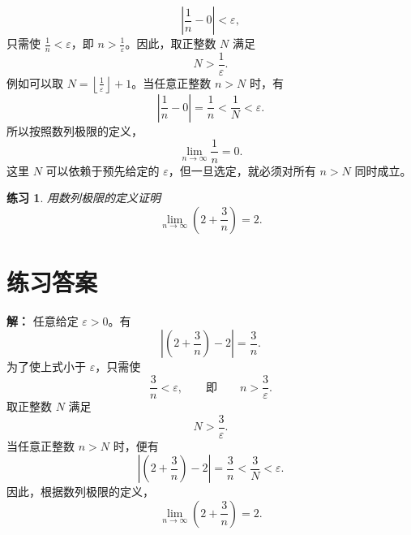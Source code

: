 \documentclass[UTF8,fontset=fandol,11pt]{ctexart}
\newtheorem{exercise}[definition]{练习}
\begin{document}
\[
\left|\frac{1}{n}-0\right|<\varepsilon,
\]
只需使 $\frac{1}{n}<\varepsilon$，即 $n>\frac{1}{\varepsilon}$。因此，取正整数 $N$ 满足
\[
N>\frac{1}{\varepsilon}.
\]
例如可以取 $N=\left\lfloor\frac{1}{\varepsilon}\right\rfloor+1$。当任意正整数 $n>N$ 时，有
\[
\left|\frac{1}{n}-0\right|=\frac{1}{n}<\frac{1}{N}<\varepsilon.
\]
所以按照数列极限的定义，
\[
\lim_{n\to\infty}\frac{1}{n}=0.
\tag{1}\label{eq:reciprocal-limit}
\]
这里 $N$ 可以依赖于预先给定的 $\varepsilon$，但一旦选定，就必须对所有 $n>N$ 同时成立。
\par
\begin{exercise}

用数列极限的定义证明
\[
\lim_{n\to\infty}\left(2+\frac{3}{n}\right)=2.
\]

\end{exercise}
\section*{练习答案}
\par\noindent\textbf{解：}
任意给定 $\varepsilon>0$。有
\[
\left|\left(2+\frac{3}{n}\right)-2\right|=\frac{3}{n}.
\]
为了使上式小于 $\varepsilon$，只需使
\[
\frac{3}{n}<\varepsilon,
\qquad\text{即}\qquad
n>\frac{3}{\varepsilon}.
\]
取正整数 $N$ 满足
\[
N>\frac{3}{\varepsilon}.
\]
当任意正整数 $n>N$ 时，便有
\[
\left|\left(2+\frac{3}{n}\right)-2\right|
=\frac{3}{n}
<\frac{3}{N}
<\varepsilon.
\]
因此，根据数列极限的定义，
\[
\lim_{n\to\infty}\left(2+\frac{3}{n}\right)=2.
\]
\par
\end{document}
